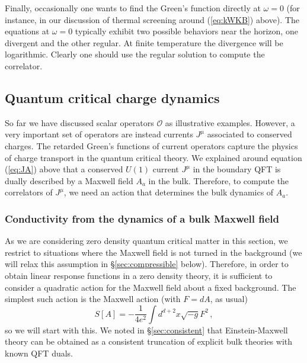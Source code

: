 \documentclass[10pt, oneside]{book}
\def\be{\begin{equation}}
\def\ee{\end{equation}}
\def\ocal{{\mathcal{O}}}
\begin{document}
\begin{doublespace}
Finally, occasionally one wants to find the Green's function directly at $\omega = 0$ (for instance, in our discussion of thermal screening around (\ref{eq:kWKB}) above). The equations at $\omega = 0$ typically exhibit two possible behaviors near the horizon, one divergent and the other regular. At finite temperature the divergence will be logarithmic. Clearly one should use the regular solution to compute the correlator.


\subsection{Quantum critical charge dynamics}

So far we have discussed scalar operators $\ocal$ as illustrative examples. However, a very important set of operators are instead currents $J^\mu$ associated to conserved charges. The retarded Green's functions of current operators capture the physics of charge transport in the quantum critical theory. We explained around equation (\ref{eq:JA}) above that a conserved $U(1)$ current $J^\mu$ in the boundary QFT is dually described by a Maxwell field $A_a$ in the bulk. Therefore, to compute the correlators of $J^\mu$, we need an action that determines the bulk dynamics of $A_a$.

\subsubsection{Conductivity from the dynamics of a bulk Maxwell field}
\label{sec:maxw}

As we are considering zero density quantum critical matter in this section, we restrict to situations where the Maxwell field is not turned in the background (we will relax this assumption in \S \ref{sec:compressible} below). Therefore, in order to obtain linear response functions in a zero density theory, it is sufficient to consider a quadratic action for the Maxwell field about a fixed background. The simplest such action is the Maxwell action (with $F=dA$, as usual)
\be\label{eq:Maxwell}
S[A] = - \frac{1}{4 e^2} \int d^{d+2}x \sqrt{-g} F^2 \,,
\ee
so we will start with this. We noted in \S\ref{sec:consistent} that Einstein-Maxwell theory can be obtained as a consistent truncation of explicit bulk theories with known QFT duals.


\end{doublespace}
\end{document}
